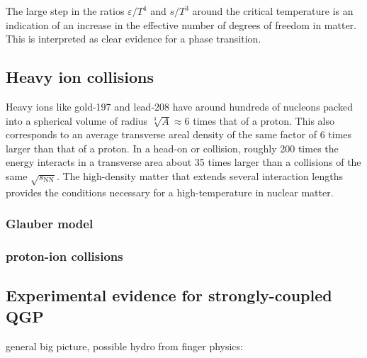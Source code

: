 The large step in the ratios $\varepsilon/T^4$ and $s/T^3$ around the critical temperature is an indication of an increase in the effective number of degrees of freedom in \qcd matter.
This is interpreted as clear evidence for a phase transition.

\subsection{Heavy ion collisions}
Heavy ions like gold-197 and lead-208 have around hundreds of nucleons packed into a spherical volume of radius $\sqrt[3]{A} \approx 6$ times that of a proton.
This also corresponds to an average transverse areal density of the same factor of 6 times larger than that of a proton.
In a head-on \AuAu or \PbPb collision, roughly 200 times the energy interacts in a transverse area about 35 times larger than a \pp collisions of the same $\sqrt{s_\mathrm{NN}}$.
The high-density matter that extends several interaction lengths provides the conditions necessary for a high-temperature in nuclear matter.

\subsubsection{Glauber model}
\cite{Miller:2007ri} %
\subsubsection{proton-ion collisions}

\subsection{Experimental evidence for strongly-coupled QGP}

general big picture, possible hydro from finger physics: \cite{Busza:2018rrf} %


